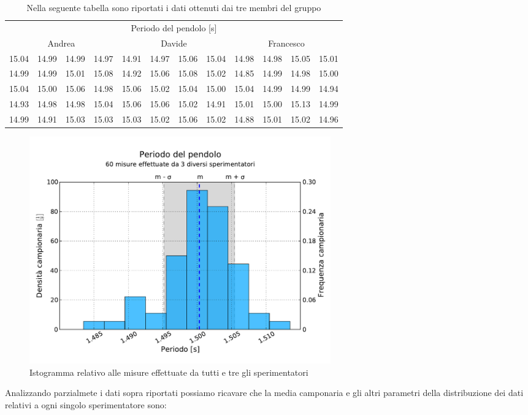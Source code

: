\documentclass[12pt, twoside, a4paper]{article}
\begin{document}
\begin{table}[bht]
	\begin{tabular} {c c c c | c c c c | c c c c}
		\toprule
		\multicolumn{12}{c}{Periodo del pendolo [s]} \\
		\multicolumn{4}{c}{Andrea} & \multicolumn{4}{c}{Davide} & \multicolumn{4}{c}{Francesco} \\
		\midrule
		15.04 & 14.99 & 14.99 & 14.97 & 14.91 & 14.97 & 15.06 & 15.04 & 14.98 & 14.98 & 15.05 & 15.01 \\
		14.99 & 14.99 & 15.01 & 15.08 & 14.92 & 15.06 & 15.08 & 15.02 & 14.85 & 14.99 & 14.98 & 15.00 \\
		15.04 & 15.00 & 15.06 & 14.98 & 15.06 & 15.02 & 15.04 & 15.00 & 15.04 & 14.99 & 14.99 & 14.94 \\
		14.93 & 14.98 & 14.98 & 15.04 & 15.06 & 15.06 & 15.02 & 14.91 & 15.01 & 15.00 & 15.13 & 14.99 \\
		14.99 & 14.91 & 15.03 & 15.03 & 15.03 & 15.02 & 15.06 & 15.02 & 14.88 & 15.01 & 15.02 & 14.96 \\
		\bottomrule
	\end{tabular}
	\caption{Nella seguente tabella sono riportati i dati ottenuti dai tre membri del gruppo }
\end{table}

\begin{figure}
	\centering
	\includegraphics[width=130mm]{Pendolo.pdf}
	\caption{Istogramma relativo alle misure effettuate da tutti e tre gli sperimentatori}
\end{figure}

Analizzando parzialmete i dati sopra riportati possiamo ricavare che la media camponaria e gli altri parametri della distribuzione dei dati relativi a ogni singolo sperimentatore sono:
\end{document}
